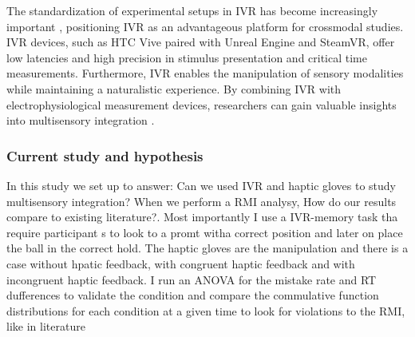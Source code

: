 \documentclass[12pt,oneside,openright]{report}
\begin{document}



The standardization of experimental setups in IVR has become increasingly important \parencite{Vasser2020GuidelinesFI,deGelder2018VirtualRA,Schne2023TheRO,vr_respont}, positioning IVR as an advantageous platform for crossmodal studies. IVR devices, such as HTC Vive paired with Unreal Engine and SteamVR, offer low latencies and high precision in stimulus presentation and critical time measurements. Furthermore, IVR enables the manipulation of sensory modalities while maintaining a naturalistic experience. By combining IVR with electrophysiological measurement devices, researchers can gain valuable insights into multisensory integration \parencite{Vasser2020GuidelinesFI}.

\subsubsection*{Current study and hypothesis}

In this study we set up to answer: Can we used IVR and haptic gloves to study multisensory integration? When we perform a RMI analysy, How do our results compare to existing literature?. Most importantly I use a IVR-memory task tha require participant s to look to a promt witha correct position and later on place the ball in the correct hold. The haptic gloves are the manipulation and there is a case without hpatic feedback, with congruent haptic feedback and with incongruent haptic feedback. I run an ANOVA for the mistake rate and RT dufferences to validate the condition and compare the commulative function distributions for each condition at a given time to look for violations to the RMI, like in literature 
\end{document}
